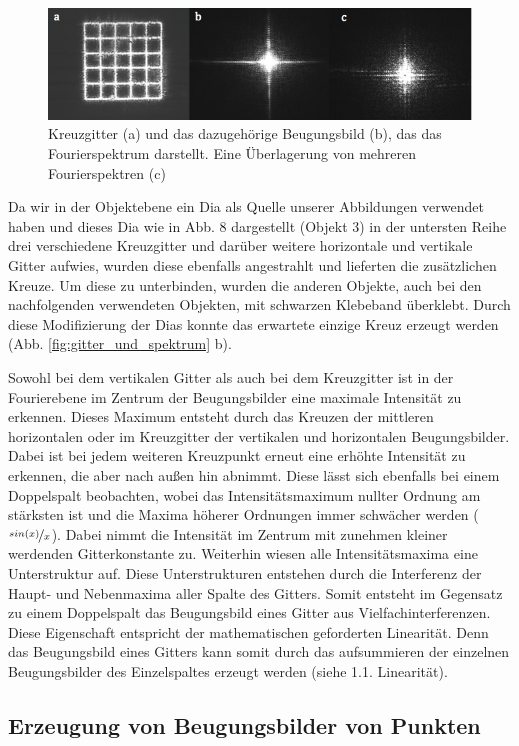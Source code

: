 \begin{figure}[h]
	\centering
	\includegraphics[width=0.10\linewidth]{Regina/abb14}
	\caption[Kreuzgitter mit Fourierspektrum]{Kreuzgitter (a) und das dazugehörige Beugungsbild (b), das das Fourierspektrum darstellt. Eine Überlagerung von mehreren Fourierspektren (c)}
	\label{fig:kreuzgitter_und_spektrum}
\end{figure}

Da wir in der Objektebene ein Dia als Quelle unserer Abbildungen
verwendet haben und dieses Dia wie in Abb. 8 dargestellt (Objekt 3) in der untersten Reihe drei verschiedene Kreuzgitter und darüber weitere horizontale und vertikale Gitter aufwies,
wurden diese ebenfalls angestrahlt und lieferten die zusätzlichen Kreuze. Um diese zu unterbinden, wurden die anderen Objekte, auch bei den nachfolgenden verwendeten Objekten, mit schwarzen Klebeband überklebt. Durch diese Modifizierung der Dias konnte das erwartete einzige Kreuz erzeugt werden (Abb. \ref{fig:gitter_und_spektrum} b).

Sowohl bei dem vertikalen Gitter als auch bei dem Kreuzgitter ist in der Fourierebene im Zentrum der Beugungsbilder eine maximale Intensität zu erkennen. Dieses Maximum entsteht durch das Kreuzen der mittleren horizontalen oder im Kreuzgitter der vertikalen und
horizontalen Beugungsbilder. Dabei ist bei jedem weiteren Kreuzpunkt erneut eine erhöhte Intensität zu erkennen, die aber nach außen hin abnimmt. Diese lässt sich ebenfalls bei einem
Doppelspalt beobachten, wobei das Intensitätsmaximum nullter Ordnung am stärksten ist und die Maxima höherer Ordnungen immer schwächer werden ($\nicefrac{sin(x)}{x}$). Dabei nimmt die Intensität im Zentrum mit zunehmen kleiner werdenden Gitterkonstante zu.
Weiterhin wiesen alle Intensitätsmaxima eine Unterstruktur auf. Diese Unterstrukturen entstehen durch die Interferenz der Haupt- und Nebenmaxima aller Spalte des Gitters. Somit entsteht im Gegensatz zu einem Doppelspalt das Beugungsbild eines Gitter aus Vielfachinterferenzen. Diese Eigenschaft entspricht der mathematischen geforderten Linearität. Denn das Beugungsbild eines Gitters kann somit durch das aufsummieren der einzelnen Beugungsbilder des Einzelspaltes erzeugt werden (siehe 1.1. Linearität).

\subsection{Erzeugung von Beugungsbilder von Punkten}

